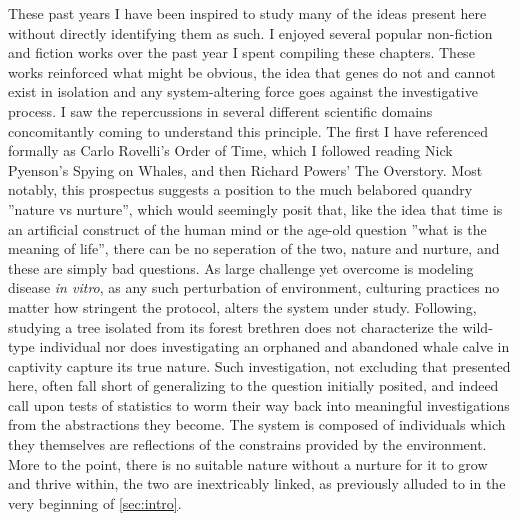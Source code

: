 
These past years I have been inspired to study many of the ideas present here without directly identifying them as such. I enjoyed several popular non-fiction and fiction works over the past year I spent compiling these chapters. These works reinforced what might be obvious, the idea that genes do not and cannot exist in isolation and any system-altering force goes against the investigative process. I saw the repercussions in several different scientific domains concomitantly coming to understand this principle. The first I have referenced formally as Carlo Rovelli's Order of Time\cite{rovelli}, which I followed reading Nick Pyenson's Spying on Whales\cite{pyenson},  and then Richard Powers' The Overstory\cite{powers}. Most notably, this prospectus suggests a position to the much belabored quandry ''nature vs nurture'', which would seemingly posit that, like the idea that time is an artificial construct of the human mind or the age-old question ''what is the meaning of life'', there can be no seperation of the two, nature and nurture, and these are simply bad questions. As large challenge yet overcome is modeling disease \emph{in vitro}, as any such perturbation of environment, \ie culturing practices no matter how stringent the protocol, alters the system under study. Following, studying a tree isolated from its forest brethren does not characterize the wild-type individual nor does investigating an orphaned and abandoned whale calve in captivity capture its true nature. Such investigation, not excluding that presented here, often fall short of generalizing to the question initially posited, and indeed call upon tests of statistics to worm their way back into meaningful investigations from the abstractions they become. The system is composed of individuals which they themselves are reflections of the constrains provided by the environment. More to the point, there is no suitable nature without a nurture for it to grow and thrive within, the two are inextricably linked, as previously alluded to in the very beginning of \cref{sec:intro}.





